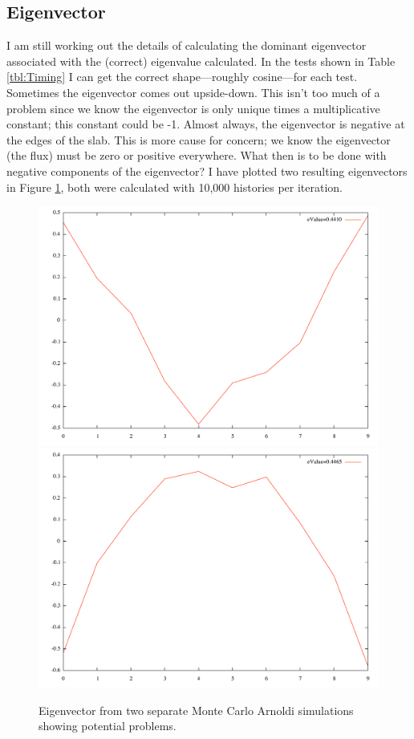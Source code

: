 \documentclass[12pt]{article}
\begin{document}
\subsection{Eigenvector}
I am still working out the details of calculating the dominant eigenvector associated with the (correct) eigenvalue calculated.  In the tests shown in Table \ref{tbl:Timing} I can get the correct shape---roughly cosine---for each test.  Sometimes the eigenvector comes out upside-down.  This isn't too much of a problem since we know the eigenvector is only unique times a multiplicative constant; this constant could be -1.  Almost always, the eigenvector is negative at the edges of the slab.  This is more cause for concern; we know the eigenvector (the flux) must be zero or positive everywhere.  What then is to be done with negative components of the eigenvector?  I have plotted two resulting eigenvectors in Figure \ref{fig:Vector}, both were calculated with 10,000 histories per iteration.


\begin{figure}[h]\centering
    \includegraphics[width=5in, keepaspectratio]{NegativeEigenvector.pdf}
    \includegraphics[width=5in, keepaspectratio]{PositiveEigenvector.pdf}
    \caption{Eigenvector from two separate Monte Carlo Arnoldi simulations showing potential problems.}
    \label{fig:Vector}
\end{figure}
\end{document}
